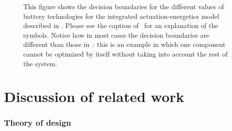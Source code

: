 \begin{figure}
\begin{centering}
{\begin{centering}
\par\end{centering}
}
\par\end{centering}
\begin{centering}
\par\end{centering}
\caption{\label{fig:drone_choice}This figure shows the decision boundaries
for the different values of battery technologies for the integrated
actuation-energetics model described in . Please
see the caption of~ for an explanation of the
symbols. Notice how in most cases the decision boundaries are different
than those in~: this is an example in which
one component cannot be optimized by itself without taking into account
the rest of the system.}
\end{figure}




\section{Discussion of related work\label{sec:Discussion-of-related}}

\subsubsection*{Theory of design}

